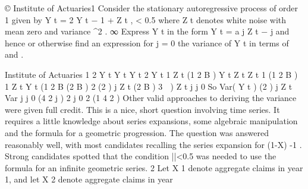 \documentclass[a4paper,12pt]{article}
\begin{document}
© Institute of Actuaries1
Consider the stationary autoregressive process of order 1 given by
Y t = 2 \alpha Y t − 1 + Z t ,
\alpha < 0.5
where Z t denotes white noise with mean zero and variance \sigma^2  .
∞
Express Y t in the form Y t = \sum a j Z t − j and hence or otherwise find an expression for
j = 0
the variance of Y t in terms of \alpha and \sigma  .



Institute of Actuaries%
1
2 Y t
Y t
Y t
2 Y t
1 Z t
(1 2 B ) Y t Z t
Z t
1
(1 2 B ) 1 Z t
Y t
(1 2 B (2 B ) 2
(2 ) j Z t
(2 B ) 3  ) Z t
j
j 0
So
Var( Y t )
(2 ) j Z t
Var
j
j 0
(4
2 j
)
2
j 0
2
(1 4
2
)
Other valid approaches to deriving the variance were given full credit.
This is a nice, short question involving time series. It requires a little knowledge about
series expansions, some algebraic manipulation and the formula for a geometric
progression. The question was answered reasonably well, with most candidates
recalling the series expansion for (1-X) -1 . Strong candidates spotted that the condition
|\alpha|<0.5 was needed to use the formula for an infinite geometric series.
2
Let X 1 denote aggregate claims in year 1, and let X 2 denote aggregate claims in year
\end{document}
